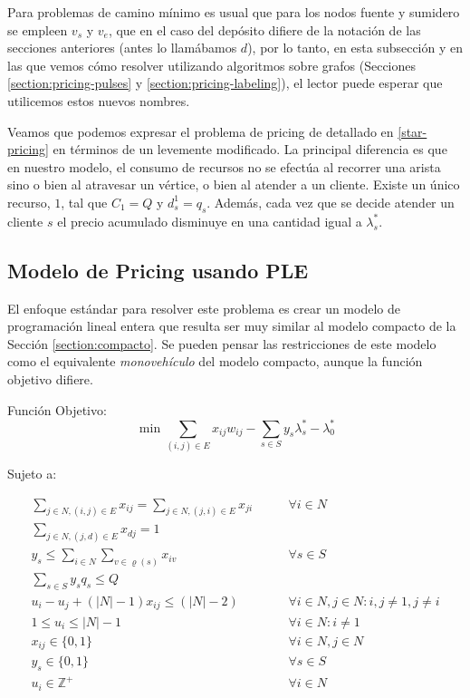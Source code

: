 Para problemas de camino mínimo es usual que para los nodos fuente y sumidero se empleen $v_s$ y $v_e$, que en el caso del depósito difiere de la notación de las secciones anteriores (antes lo llamábamos $d$), por lo tanto, en esta subsección y en las que vemos cómo resolver  utilizando algoritmos sobre grafos (Secciones \ref{section:pricing-pulses} y \ref{section:pricing-labeling}), el lector puede esperar que utilicemos estos nuevos nombres.

Veamos que podemos expresar el problema de pricing de  detallado en \ref{star-pricing} en términos de un  levemente modificado. La principal diferencia es que en nuestro modelo, el consumo de recursos no se efectúa al recorrer una arista sino o bien al atravesar un vértice, o bien al atender a un cliente. Existe un único recurso, $1$, tal que $C_1 = Q$ y $d_{s}^{1} = q_s$. Además, cada vez que se decide atender un cliente $s$ el precio acumulado disminuye en una cantidad igual a $\lambda^{*}_s$.


\subsection{Modelo de Pricing usando PLE}
\label{section:pricing-ple}

El enfoque estándar para resolver este problema es crear un modelo de programación lineal entera que resulta ser muy similar al modelo compacto de la Sección \ref{section:compacto}. Se pueden pensar las restricciones de este modelo como el equivalente \emph{monovehículo} del modelo compacto, aunque la función objetivo difiere. 

Función Objetivo:
\begin{equation}
\min \sum_{(i, j) \in E} {x_{ij} w_{ij}} - \sum_{s \in S} {y_{s} \lambda^*_s - \lambda^*_0}
\end{equation}

Sujeto a:

\begin{align}
    \sum_{j \in N, (i, j) \in E}{x_{ij}} = \sum_{j \in N, (j, i) \in E}{x_{ji}} \qquad & \forall {i \in N} \label{eq:pricing1} \\
    \sum_{j \in N, (j, d) \in E}{x_{dj}} = 1 & \label{eq:pricing2} \\
    y_{s} \leq \sum_{i \in N}\sum_{v \in \varrho(s)}{x_{iv}} \qquad & \forall {s \in S} \label{eq:pricing3} \\
    \sum_{s \in S}{y_{s}q_s} \le Q & \label{eq:pricing4} \\
    u_{i} - u_{j} + (|N| - 1)x_{ij} \leq (|N| - 2) \qquad & \forall {i \in N, j \in N : i, j \neq 1, j \neq i}  \label{eq:pricing5} \\
    1 \leq u_{i} \leq |N| - 1 \qquad & \forall {i \in N : i \neq 1} \label{eq:pricing6} \\
    x_{ij} \in \{0, 1\} \qquad & \forall {i \in N, j \in N} \label{eq:pricing7} \\
y_{s} \in \{0, 1\} \qquad & \forall {s \in S} \label{eq:pricing8}\\
u_{i} \in \mathbb{Z}^{+} \qquad & \forall {i \in N} \label{eq:pricing9}
\end{align}

